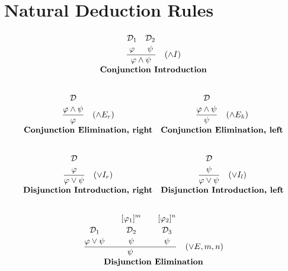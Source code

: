 
%


\chapter{Natural Deduction Rules}
\label{ann:nd_rules}

\[
\begin{array}{c c}

\multicolumn{2}{c}{
\frac{\overset{\displaystyle\mathcal{D}_1\strut}{\displaystyle \varphi \strut}\quad \overset{\displaystyle\mathcal{D}_2\strut} {\displaystyle \psi \strut}}{\displaystyle \varphi \land \psi \strut} \quad (\land I)
} \\[5pt]
\multicolumn{2}{c}{\textbf{Conjunction Introduction}} \\[10pt]
\end{array}
\]

\[
\begin{array}{c c}

\frac{\displaystyle \overset{\displaystyle\mathcal{D} \strut} {\varphi \land \psi \strut}}{\displaystyle \varphi \strut} \quad (\land E_r) 
& \frac{\displaystyle \overset{\displaystyle\mathcal{D} \strut} {\varphi \land \psi \strut}}{\displaystyle \psi \strut} \quad (\land E_k) \\[5pt]
\textbf{Conjunction Elimination, right} & \textbf{Conjunction Elimination, left} \\[10pt]
\end{array}
\]

\[
\begin{array}{c c}
\frac{\displaystyle \overset{\displaystyle\mathcal{D} \strut} {\varphi 
\strut}}{\displaystyle \varphi \vee \psi \strut} \quad (\vee I_r) 
& \frac{\displaystyle \overset{\displaystyle\mathcal{D} \strut} {\psi \strut}}{\displaystyle \varphi \vee \psi \strut} \quad (\vee I_l) \\[5pt]
\textbf{Disjunction Introduction, right} & \textbf{Disjunction Introduction, left} \\[10pt]

\end{array}
\]

\[
\begin{array}{c c}
\multicolumn{2}{c}{
\frac{\overset{\displaystyle\mathcal{D}_1 \strut} {\displaystyle\varphi \vee \psi \strut} \quad \quad \overset{\displaystyle[\varphi_1]^m\strut}{\overset{\displaystyle\mathcal{D}_2 \strut} {\displaystyle\psi 
\strut}} \quad \quad \overset{\displaystyle[\varphi_2]^n\strut}{\overset{\displaystyle\mathcal{D}_3 \strut} {\displaystyle\psi 
\strut}}}{\displaystyle\psi\strut} \quad (\vee E, m, n)
} \\[5pt]
\multicolumn{2}{c}{\textbf{Disjunction Elimination}} \\[10pt]
\end{array}
\]

